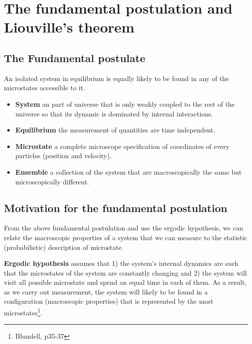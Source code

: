\documentclass{article}
\begin{document}
\section{The fundamental postulation and Liouville's theorem}

\subsection{The Fundamental postulate}
An isolated system in equilibrium is equally likely to be found in any
of the microstates accessible to it.

\begin{itemize}
    \item \textbf{System} an part of universe that is only weakly coupled to the rest of the universe 
    so that its dynamic is dominated by internal interactions.
    \item \textbf{Equilibrium} the measurement of quantities are time independent.
    \item \textbf{Microstate} a complete microscope specification of coordinates of every particles (position and velocity).
    \item \textbf{Ensemble} a collection of the system that are macroscopically the same but microscopically different. 
\end{itemize}

\subsection{Motivation for the fundamental postulation}
From the above fundamental postulation and use the ergodic hypothesis, we can relate the macroscopic properties of a system that we can measure 
to the statistic (probabilistic) description of microstate. 

\textbf{Ergodic hypothesis} assumes that 1) the system's internal dynamics are such that the microstates of the system are 
constantly changing and 2) the system will visit all possible microstate and spend an equal time in each of them. 
As a result, as we carry out measurement, the system will likely to be found in a configuration (macroscopic properties) that 
is represented by the most microstates\footnote{Blundell, p35-37}. 
\end{document}
